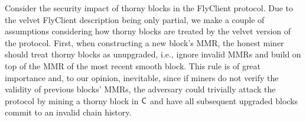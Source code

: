 	Consider the security impact of thorny blocks in the FlyClient protocol.
	Due to the velvet FlyClient description being only partial, we
	make a couple of assumptions considering how thorny blocks are treated by the velvet version of the protocol.
	First, when constructing a new block's MMR, the honest miner should treat thorny blocks as unupgraded, 
	i.e., ignore invalid MMRs and build on top of the MMR of the most recent smooth block. 
	This rule is of great importance and, to our opinion, inevitable, since if miners do not verify the 
	validity of previous blocks' MMRs, the adversary could trivially attack the protocol by mining a thorny block in $\mathsf{C}$ and have all subsequent upgraded
	blocks commit to an invalid chain history.  
	
